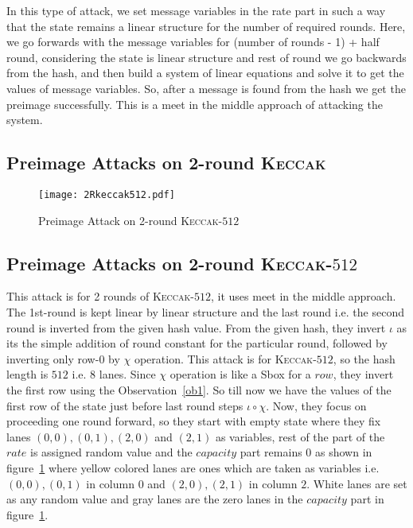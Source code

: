 \documentclass[runningheads]{llncs}
\newcommand{\KECCAK}{\mbox{\textsc{Keccak}}}
\begin{document}
In this type of attack, we set message variables in the rate part in such a way that the state remains a linear structure for the number of required rounds. Here, we go forwards with the message variables for (number of rounds - 1) + half round, considering the state is linear structure and rest of round we go backwards from the hash, and then build a system of linear equations and solve it to get the values of message variables. So, after a message is found from the hash we get the preimage successfully. This is a meet in the middle approach of attacking the system.

\subsection{Preimage Attacks on 2-round \KECCAK}

\begin{figure}
    \centering
    \texttt{[image: 2Rkeccak512.pdf]}
    \caption{Preimage Attack on 2-round \KECCAK-$512$}
    \label{fig:2rkeccak512}
\end{figure}

\subsection{Preimage Attacks on 2-round \KECCAK-$512$}
		This attack is for 2 rounds of \KECCAK-$512$, it uses meet in the middle approach. The 1st-round is kept linear by linear structure and the last round i.e. the second round is inverted from the given hash value. From the given hash, they invert $\iota$ as its the simple addition of round constant for the particular round, followed by inverting only row-$0$ by $\chi$ operation. This attack is for \KECCAK-$512$, so the hash length is $512$ i.e. $8$ lanes. Since $\chi$ operation is like a Sbox for a $row$, they invert the first row using the Observation~\ref{ob1}. So till now we have the values of the first row of the state just before last round steps $\iota \circ \chi$. Now, they focus on proceeding one round forward, so they start with empty state where they fix lanes $(0,0), (0,1), (2,0) $ and $(2,1)$ as variables, rest of the part of the $rate$ is assigned random value and the $capacity$ part remains $0$ as shown in figure~\ref{fig:2rkeccak512} where yellow colored lanes are ones which are taken as variables i.e. $(0,0), (0,1)$ in column $0$ and $(2,0), (2,1)$ in column $2$. White lanes are set as any random value and gray lanes are the zero lanes in the $capacity$ part in figure~\ref{fig:2rkeccak512}.
		
\end{document}

